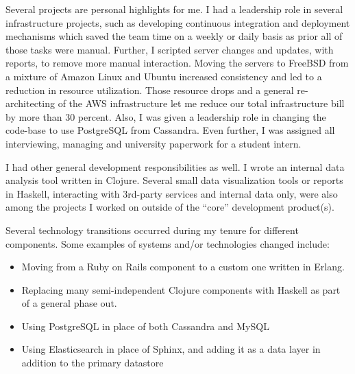 \documentclass[margintitle,line]{res}
\begin{document}
\begin{resume}
\begin{position}
  Several projects are personal highlights for me. I had a leadership role
  in several infrastructure projects, such as developing continuous integration
  and deployment mechanisms which saved the team time on a weekly or daily basis
  as prior all of those tasks were manual. Further, I scripted server changes
  and updates, with reports, to remove more manual interaction. Moving the
  servers to FreeBSD from a mixture of Amazon Linux and Ubuntu increased
  consistency and led to a reduction in resource utilization. Those resource
  drops and a general re-architecting of the AWS infrastructure let me
  reduce our total infrastructure bill by more than 30 percent. Also, I was
  given a leadership role in changing the code-base to use PostgreSQL from Cassandra.
  Even further, I was assigned all interviewing, managing and university paperwork
  for a student intern.


  I had other general development responsibilities as well. I wrote an
  internal data analysis tool written in Clojure. Several small data visualization
  tools or reports in Haskell, interacting with 3rd-party services and internal
  data only, were also among the projects I worked on outside of the ``core''
  development product(s).


  Several technology transitions occurred during my tenure for different components.
  Some examples of systems and/or technologies changed include:
  \begin{itemize}
    \item{Moving from a Ruby on Rails component to a custom one written in Erlang.}
    \item{Replacing many semi-independent Clojure components with Haskell
      as part of a general phase out.}
    \item{Using PostgreSQL in place of both Cassandra and MySQL}
    \item{Using Elasticsearch in place of Sphinx, and adding it as a data layer
      in addition to the primary datastore}
  \end{itemize}


\end{position}
\end{resume}
\end{document}
